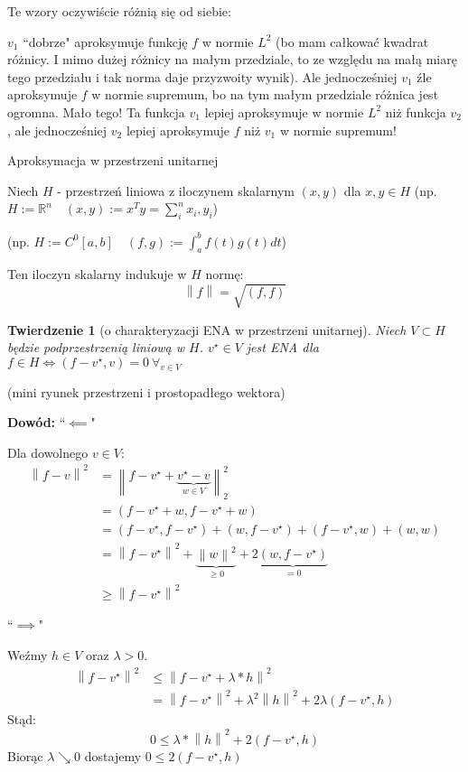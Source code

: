 \documentclass[hidelinks,a4paper,fleqn,oneside]{book}
\newcommand{\RR}{\mathbb{R}}
\newcommand{\norm}[1]{\left\lVert#1\right\rVert}
\newtheorem{twierdz}{Twierdzenie}
\begin{document}
Te wzory oczywiście różnią się od siebie:

\begin{tikzpicture}

\end{tikzpicture}

$v_1$ ``dobrze" aproksymuje funkcję $f$ w normie $L^2$ (bo mam całkować kwadrat różnicy. I mimo dużej różnicy na małym przedziale, to ze względu na małą miarę tego przedziału i tak norma daje przyzwoity wynik). Ale jednocześniej $v_1$ źle aproksymuje $f$ w normie supremum, bo na tym małym przedziale różnica jest ogromna. Mało tego! Ta funkcja $v_1$ lepiej aproksymuje w normie $L^2$ niż funkcja $v_2$, ale jednocześniej $v_2$ lepiej aproksymuje $f$ niż $v_1$ w normie supremum!

\textrm{Aproksymacja w przestrzeni unitarnej}

Niech $H$ - przestrzeń liniowa z iloczynem skalarnym $(x, y)$ dla $x, y \in H$ (np. $H:=\RR^n \quad (x, y) := x^Ty = \sum_i^n x_i, y_i$)

(np. $H:=C^0[a, b] \quad (f, g) := \int_a^b f(t)g(t) dt$)

Ten iloczyn skalarny indukuje w $H$ normę:
\[
	\norm{f} = \sqrt{(f, f)}
\]

\begin{twierdz}[o charakteryzacji ENA w przestrzeni unitarnej]
Niech $V \subset H$ będzie podprzestrzenią liniową w $H$. $v^\star \in V$ jest ENA dla $f \in H \iff (f-v^\star, v) = 0 \ \forall_{v \in V}$ 
\end{twierdz}

(mini ryunek przestrzeni i prostopadłego wektora)

\textbf{Dowód:} ``$\impliedby$"

Dla dowolnego $v \in V$:
\[
	\begin{array}{rl}
	\norm{f-v}^2 & = \norm{f - v^\star + \underbrace{v^\star - v}_{w \in V}}_2^2 \\
	& = (f-v^\star + w, f-v^\star + w) \\
	& = (f-v^\star, f-v^\star) + (w, f-v^\star) + (f-v^\star, w) + (w, w) \\
	& = \norm{f-v^\star}^2 + \underbrace{\norm{w}^2}_{\geq 0} + 2\underbrace{(w, f-v^\star)}_{=0} \\
	& \geq \norm{f-v^\star}^2
	\end{array}
\]

``$\implies$"

Weźmy $h \in V$ oraz $\lambda > 0$.
\[
	\begin{array}{rl}
	\norm{f-v^\star}^2 & \leq \norm{f-v^\star + \lambda*h}^2 \\
		& = \norm{f-v^\star}^2 + \lambda^2\norm{h}^2 + 2\lambda(f-v^\star, h)
	\end{array}
\]
Stąd:
\[
	0 \leq \lambda * \norm{h}^2 + 2(f-v^\star, h)
\]
Biorąc $\lambda \searrow 0$ dostajemy $0 \leq 2(f-v^\star, h)$
\end{document}
